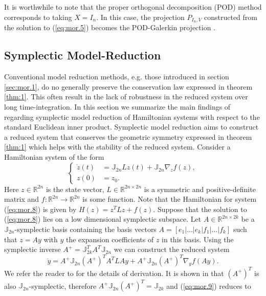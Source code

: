 It is worthwhile to note that the proper orthogonal decomposition (POD) method \cite{hesthaven2015certified} corresponds to taking $X = I_n$. In this case, the projection $P_{I_n,V}$ constructed from the solution to (\ref{eq:mor.5}) becomes the POD-Galerkin projection \cite{hesthaven2015certified}.

\subsection{Symplectic Model-Reduction} \label{sec:mor.2}
Conventional model reduction methods, e.g. those introduced in section \ref{sec:mor.1}, do no generally preserve the conservation law expressed in theorem \ref{thm:1}. This often result in the lack of robustness in the reduced system over long time-integration. In this section we summarize the main findings of \cite{doi:10.1137/17M1111991} regarding symplectic model reduction of Hamiltonian systems with respect to the standard Euclidean inner product. Symplectic model reduction aims to construct a reduced system that conserves the geometric symmetry expressed in theorem \ref{thm:1} which helps with the stability of the reduced system.
Consider a Hamiltonian system of the form
\begin{equation} \label{eq:mor.8}
\left\{
\begin{aligned}
	\dot z(t) &= \mathbb J_{2n} L z(t) + \mathbb J_{2n} \nabla_z f(z), \\
	z(0) &= z_0.
\end{aligned}
\right.
\end{equation}
Here $z\in \mathbb R^{2n}$ is the state vector, $L\in\mathbb R^{2n\times 2n}$ is a symmetric and positive-definite matrix and $f:\mathbb R^{2n}\to\mathbb R^{2n}$ is some function. Note that the Hamiltonian for system (\ref{eq:mor.8}) is given by $H(z) = z^TLz + f(z)$. Suppose that the solution to (\ref{eq:mor.8}) lies on a low dimensional symplectic subspace. Let $A\in \mathbb{R}^{2n\times 2k}$ be a $\mathbb{J}_{2n}$-symplectic basis containing the basis vectors $A=[e_1|\dots|e_k|f_1|\dots|f_k]$ such that $z = Ay$ with $y$ the expansion coefficients of $z$ in this basis. Using the symplectic inverse $A^+ = \mathbb J_{2k}^T A^T \mathbb J_{2n}$ we can construct the reduced system
\begin{equation} \label{eq:mor.9}
	\dot y = A^+ \mathbb J_{2n} (A^+)^T A^T L A y + A^+ \mathbb J_{2n} (A^+)^T \nabla_y f(Ay).
\end{equation}
We refer the reader to \cite{doi:10.1137/17M1111991} for the details of derivation. It is shown in \cite{doi:10.1137/140978922} that $(A^+)^T$ is also $\mathbb J_{2n}$-symplectic, therefore $A^+ \mathbb J_{2n} (A^+)^T = \mathbb J_{2k}$ and (\ref{eq:mor.9}) reduces to
